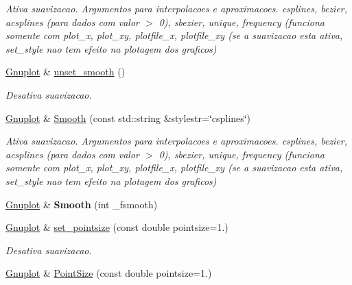 \begin{DoxyCompactItemize}
\begin{DoxyCompactList}\small\item\em Ativa suavizacao. Argumentos para interpolacoes e aproximacoes. csplines, bezier, acsplines (para dados com valor $>$ 0), sbezier, unique, frequency (funciona somente com plot\-\_\-x, plot\-\_\-xy, plotfile\-\_\-x, plotfile\-\_\-xy (se a suavizacao esta ativa, set\-\_\-style nao tem efeito na plotagem dos graficos) \end{DoxyCompactList}\item 
\hypertarget{classGnuplot_aec18795f217d6d8791275a1c866b550e}{\hyperlink{classGnuplot}{Gnuplot} \& \hyperlink{classGnuplot_aec18795f217d6d8791275a1c866b550e}{unset\-\_\-smooth} ()}\label{classGnuplot_aec18795f217d6d8791275a1c866b550e}

\begin{DoxyCompactList}\small\item\em Desativa suavizacao. \end{DoxyCompactList}\item 
\hypertarget{classGnuplot_aedd7a473c34c83b3b9ec1cea9891d0f2}{\hyperlink{classGnuplot}{Gnuplot} \& \hyperlink{classGnuplot_aedd7a473c34c83b3b9ec1cea9891d0f2}{Smooth} (const std\-::string \&stylestr=\char`\"{}csplines\char`\"{})}\label{classGnuplot_aedd7a473c34c83b3b9ec1cea9891d0f2}

\begin{DoxyCompactList}\small\item\em Ativa suavizacao. Argumentos para interpolacoes e aproximacoes. csplines, bezier, acsplines (para dados com valor $>$ 0), sbezier, unique, frequency (funciona somente com plot\-\_\-x, plot\-\_\-xy, plotfile\-\_\-x, plotfile\-\_\-xy (se a suavizacao esta ativa, set\-\_\-style nao tem efeito na plotagem dos graficos) \end{DoxyCompactList}\item 
\hypertarget{classGnuplot_a9eaf8050edfad9d926d41b102d2f24cb}{\hyperlink{classGnuplot}{Gnuplot} \& {\bfseries Smooth} (int \-\_\-fsmooth)}\label{classGnuplot_a9eaf8050edfad9d926d41b102d2f24cb}

\item 
\hyperlink{classGnuplot}{Gnuplot} \& \hyperlink{classGnuplot_a95ec1636a871447dfe99463b769339c7}{set\-\_\-pointsize} (const double pointsize=1.)
\begin{DoxyCompactList}\small\item\em Desativa suavizacao. \end{DoxyCompactList}\item 
\hypertarget{classGnuplot_adb4a794cf81d9b615f133feca1e917e8}{\hyperlink{classGnuplot}{Gnuplot} \& \hyperlink{classGnuplot_adb4a794cf81d9b615f133feca1e917e8}{Point\-Size} (const double pointsize=1.)}\label{classGnuplot_adb4a794cf81d9b615f133feca1e917e8}


\end{DoxyCompactItemize}
